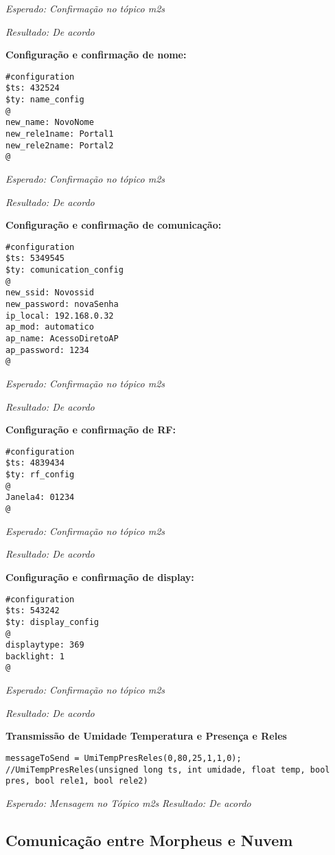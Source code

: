 \textit{Esperado: Confirmação no tópico \wmqtt m2s}

\textit{Resultado: De acordo}

\textbf{Configuração e confirmação de nome:}
\begin{lstlisting}
#configuration
$ts: 432524
$ty: name_config
@
new_name: NovoNome
new_rele1name: Portal1
new_rele2name: Portal2
@
\end{lstlisting}

\textit{Esperado: Confirmação no tópico \wmqtt m2s}

\textit{Resultado: De acordo}

\textbf{Configuração e confirmação de comunicação:}
\begin{lstlisting}
#configuration
$ts: 5349545
$ty: comunication_config
@
new_ssid: Novossid
new_password: novaSenha
ip_local: 192.168.0.32
ap_mod: automatico
ap_name: AcessoDiretoAP
ap_password: 1234
@
\end{lstlisting}

\textit{Esperado: Confirmação no tópico \wmqtt m2s}

\textit{Resultado: De acordo}

\textbf{Configuração e confirmação de RF:}
\begin{lstlisting}
#configuration
$ts: 4839434
$ty: rf_config
@
Janela4: 01234
@
\end{lstlisting}

\textit{Esperado: Confirmação no tópico \wmqtt m2s}

\textit{Resultado: De acordo}

\textbf{Configuração e confirmação de display:}
\begin{lstlisting}
#configuration
$ts: 543242
$ty: display_config
@
displaytype: 369
backlight: 1
@
\end{lstlisting}

\textit{Esperado: Confirmação no tópico \wmqtt m2s}

\textit{Resultado: De acordo}

\textbf{Transmissão de Umidade Temperatura e Presença e Reles}
\begin{lstlisting}
messageToSend = UmiTempPresReles(0,80,25,1,1,0);
//UmiTempPresReles(unsigned long ts, int umidade, float temp, bool pres, bool rele1, bool rele2)
\end{lstlisting}

\textit{Esperado: Mensagem no Tópico \wmqtt m2s}
\textit{Resultado: De acordo}


\subsection{Comunicação entre Morpheus e Nuvem}

